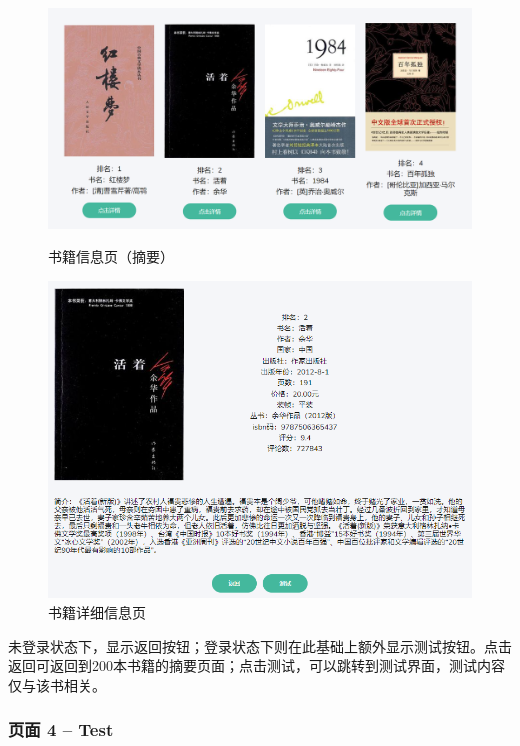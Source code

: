 \documentclass[twoside,11pt]{article}
\begin{document}
\begin{figure}[htbp]
    \begin{minipage}[t]{0.5\linewidth}
        \centering
        \includegraphics[width=0.9\columnwidth]{figures/bookBrief.png}
        \caption{书籍信息页（摘要）}\label{fig:bookBrief}
    \end{minipage}
    \begin{minipage}[t]{0.5\linewidth}
        \centering
        \includegraphics[width=0.9\columnwidth]{figures/bookDetail.png}
        \caption{书籍详细信息页}\label{fig:bookDetail}
    \end{minipage}
\end{figure}

未登录状态下，显示返回按钮；登录状态下则在此基础上额外显示测试按钮。点击返回可返回到200本书籍的摘要页面；点击测试，可以跳转到测试界面，测试内容仅与该书相关。



\subsubsection{页面 4 -- Test}
\end{document}
